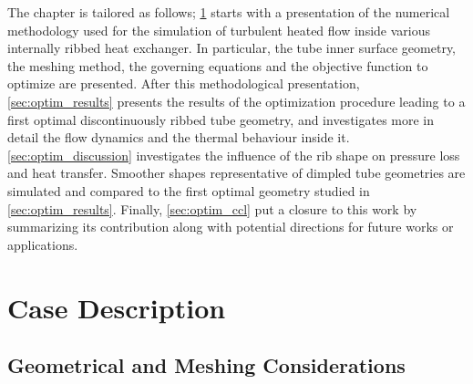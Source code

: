 The chapter is tailored as follows; \cref{sec:optim_case} starts with a presentation of the numerical methodology used for the simulation of turbulent heated flow inside various internally ribbed heat exchanger. In particular, the tube inner surface geometry, the meshing method, the governing equations and the objective function to optimize are presented. After this methodological presentation, \cref{sec:optim_results} presents the results of the optimization procedure leading to a first optimal discontinuously ribbed tube geometry, and investigates more in detail the flow dynamics and the thermal behaviour inside it. \cref{sec:optim_discussion} investigates the influence of the rib shape on pressure loss and heat transfer. Smoother shapes representative of dimpled tube geometries are simulated and compared to the first optimal geometry studied in \cref{sec:optim_results}. Finally, \cref{sec:optim_ccl} put a closure to this work by summarizing its contribution along with potential directions for future works or applications.

\section{Case Description}
\label{sec:optim_case}

\subsection{Geometrical and Meshing Considerations}

